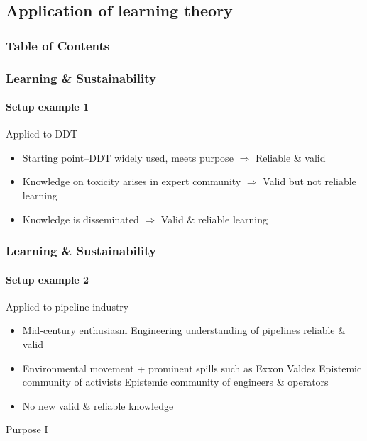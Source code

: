 
\subsection{Application of learning theory}
\begin{frame}
	\frametitle{Table of Contents}
\end{frame}

\begin{frame}
	\frametitle{Learning \& Sustainability}
	\framesubtitle{Setup example 1}
	\begin{block}{Applied to DDT \citep{Maguire2009}}
		\begin{itemize}
			\item Starting point--DDT widely used, meets purpose
				\subitem $\Rightarrow$ Reliable \& valid
			\item Knowledge on toxicity arises in expert community
				\subitem $\Rightarrow$ Valid but not reliable learning
			\item Knowledge is disseminated
				\subitem $\Rightarrow$ Valid \& reliable learning
		\end{itemize}	
	\end{block}
\end{frame}

\begin{frame}
	\frametitle{Learning \& Sustainability}
	\framesubtitle{Setup example 2}
	\begin{block}{Applied to pipeline industry}
		\begin{itemize}
			\item Mid-century enthusiasm
				\subitem Engineering understanding of pipelines reliable \& valid
			\item Environmental movement + prominent spills such as Exxon Valdez
				\subitem Epistemic community of activists \citep[e.g.,][]{Estes2019}
				\subitem Epistemic community of engineers \& operators
			\item No new valid \& reliable knowledge
		\end{itemize}	
	\end{block}
\end{frame}

\blackgroup
	\begin{frame}
		Purpose I
	\end{frame}
\egroup